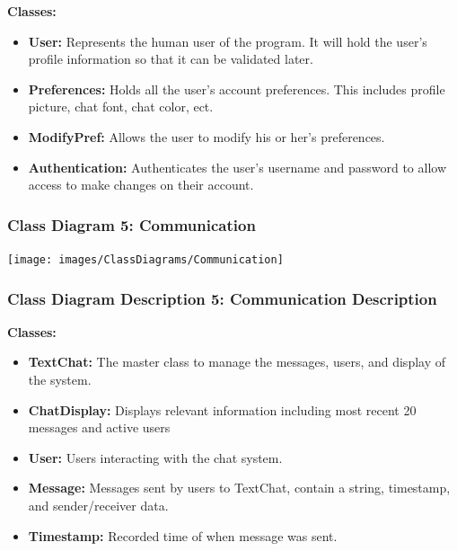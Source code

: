 \documentclass[twoside,letterpaper]{article}
\begin{document}
	\textbf{Classes:}
	\begin{itemize}
	
	       \item \textbf{User:} Represents the human user of the program. It will hold the user's profile information so that it can be validated later.
	       \item \textbf{Preferences:} Holds all the user's account preferences. This includes profile picture, chat font, chat color, ect.
	       \item \textbf{ModifyPref:} Allows the user to modify his or her's preferences.
	       \item \textbf{Authentication:} Authenticates the user's username and password to allow access to make changes on their account.
	\end{itemize}
	
	\newpage
	\subsubsection[Class Diagram 5: Communication]{\rmfamily\bfseries\color{black}
		Class Diagram 5: Communication}
	\hypertarget{RefHeading22059017292}{}
	\bigskip
	
	\texttt{[image: images/ClassDiagrams/Communication]}
	
	\newpage
	\subsubsection[Class Diagram Description 5: Communication Description]{\rmfamily\bfseries\color{black}
		Class Diagram Description 5: Communication Description}
	\hypertarget{RefHeading22059017292}{}
	
	\textbf{Classes:}
	\begin{itemize}
	
		\item \textbf{TextChat:} The master class to manage the messages, users, and display of the system.
		\item \textbf{ChatDisplay:} Displays relevant information including most recent 20 messages and active users
		\item \textbf{User:} Users interacting with the chat system.
		\item \textbf{Message:} Messages sent by users to TextChat, contain a string, timestamp, and sender/receiver data.
		\item \textbf{Timestamp:} Recorded time of when message was sent.
	\end{itemize}
	\newpage
	
\end{document}
